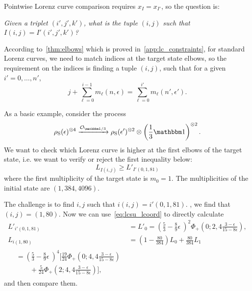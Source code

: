 Pointwise Lorenz curve comparison requires $x_{I} = x_{I'}$, so the question is: 
\begin{center}
\emph{Given a triplet $(i',j',k')$, what is the tuple $(i,j)$ such that $I(i,j) = I'(i',j',k')$?}
\end{center}

According to~\cref{thm:elbows} which is proved in~\cref{app:lc_constraints}, for standard Lorenz curves, we need to match indices at the target state elbows, so the requirement on the indices is finding a tuple $(i, j)$, such that for a given $i' = 0,\dots,n'$,
\begin{equation}
	j + \sum_{\ell=0}^{i-1} m_{\ell}(n, \epsilon) = \sum_{\ell=0}^{i'} m_{\ell}(n', \epsilon').
\end{equation}

As a basic example, consider the process 
\begin{equation}
\rho_{\rm{S}}(\epsilon)^{\otimes 4} \xrightarrow{\mathcal{O}_{\id/3}} \rho_{\rm{S}}(\epsilon')^{\otimes 2} \otimes \left( \frac{1}{3}\id \right)^{\otimes 2}.
\end{equation}
We want to check which Lorenz curve is higher at the first elbows of the target state, i.e. we want to verify or reject the first inequality below:
\begin{equation}
	L_{I(i,j)} \geq L'_{I'(0, 1, 81)}
\end{equation}
where the first multiplicity of the target state is $m_0 = 1$.
The multiplicities of the initial state are $(1, 384, 4096)$.

The challenge is to find $i,j$ such that $i(i,j) = i'(0,1,81)$.
, we find that $(i,j) = (1, 80)$.
Now we can use~\cref{eq:lcsu_lcoord} to directly calculate
\begin{align*}
	L'_{i'(0,1,81)} &= L'_0 = \left( \frac{5}{3} - \frac{8}{9}\epsilon\ \right)^2 \Phi_+\left(0;2,4\frac{3-\epsilon}{15-8\epsilon}\right), \\
	L_{i(1, 80)} &= \left(1-\frac{80}{384} \right) L_0 + \frac{80}{384} L_1 \\
	\begin{split}
	&= \left( \frac{5}{3} - \frac{8}{9}\epsilon\ \right)^4 \bigg[ \frac{19}{24} \Phi_+\left(0;4,4\frac{3-\epsilon}{15-8\epsilon}\right) \\ 
	&\qquad + \frac{5}{24}\Phi_+\left(2;4,4\frac{3-\epsilon}{15-8\epsilon}\right) \bigg],
	\end{split}
\end{align*}
and then compare them.


